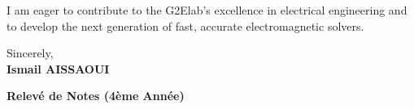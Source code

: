 \documentclass[a4paper,11pt]{article}
\begin{document}
I am eager to contribute to the G2Elab's excellence in electrical engineering and to develop the next generation of fast, accurate electromagnetic solvers.

\bigskip
Sincerely, \\
\textbf{Ismail AISSAOUI}

\newpage

\begin{center}
    {\Large\bfseries Relevé de Notes (4ème Année)}\\[20pt]
\end{center}


\end{document}
